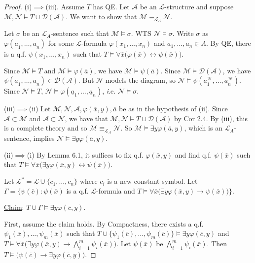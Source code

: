 \documentclass[]{article}
\theoremstyle{custhm}
\theoremstyle{cusdef}
\theoremstyle{custhm}
\theoremstyle{custhm}
\theoremstyle{custhm}
\theoremstyle{ex}
\theoremstyle{custhm}
\theoremstyle{cusdef}
\theoremstyle{remark}
\theoremstyle{remark}
\renewcommand{\L}{\mathcal{L}}
\renewcommand{\it}[1]{\textit{#1}}
\newcommand{\M}{\mathcal{M}}
\renewcommand{\phi}{\varphi}
\renewcommand{\bar}{\overline}
\newcommand{\N}{\mathcal{N}}
\newcommand{\A}{\mathcal{A}}
\newcommand{\D}{\mathcal{D}}
\begin{document}
\begin{proof}
(i)$\implies$(iii). Assume $T$ has QE. Let $\A$ be an $\L$-structure and suppose $\M,\N\models T\cup \D(\A)$. We want to show that $\M \equiv_{\L_A} \N$.

Let $\sigma$ be an $\L_A$-sentence such that $\M\models \sigma$. WTS $\N\models \sigma$. Write $\sigma$ as $\phi(\underline{a}_1,\dots,\underline{a}_n)$ for some $\L$-formula $\phi(x_1,\dots,x_n)$ and $a_1,\dots,a_n\in A$. By QE, there is a q.f. $\psi(x_1,\dots,x_n)$ such that $T\models \forall \bar{x}\big(\phi(\bar{x})\leftrightarrow \psi(\bar{x})\big)$.

Since $\M\models T$ and $\M\models \phi(\bar{a})$, we have $\M\models \psi(\bar{a})$. Since $\M\models\D(\A)$, we have $\psi(\underline{a}_1,\dots,\underline{a}_n)\in\D(\A)$. But $\N$ models the diagram, so $\N\models\psi(\underline{a}_1^\N,\dots,\underline{a}_n^\N)$. Since $\N\models T$, $\N\models \phi(\underline{a}_1,\dots,\underline{a}_n)$, {\it i.e.} $\N\models \sigma$.

(iii)$\implies$(ii) Let $\M,\N,\A,\phi(\bar{x},y),\bar{a}$ be as in the hypothesis of (ii). Since $\A\subset \M$ and $\A\subset \N$, we have that $\M,\N\models T\cup \D(\A)$ by Cor 2.4. By (iii), this is a complete theory and so $\M\equiv_{\L_A}\N$. So $\M\models \exists y\phi(\bar{a},y)$, which is an $\L_A$-sentence, implies $\N\models \exists y \phi(\bar{a},y)$.

(ii)$\implies$(i) By Lemma 6.1, it suffices to fix q.f. $\phi(\bar{x},y)$ and find q.f. $\psi(\bar{x})$ such that $T\models \forall \bar{x}\big(\exists y \phi(\bar{x},y)\leftrightarrow\psi(\bar{x})\big)$.

Let $\L^\ast = \L \cup \{c_1,\dots,c_n\}$ where $c_i$ is a new constant symbol. Let $\Gamma = \{\psi(\bar{c}): \psi(\bar{x})$ is a q.f. $\L$-formula and $T\models \forall\bar{x} \big(\exists y\phi(\bar{x},y)\rightarrow \psi(\bar{x})\big)\}$.

\underline{Claim}: $T\cup \Gamma \models \exists y\phi(\bar{c},y)$.

First, assume the claim holds. By Compactness, there exists a q.f. $\psi_1(\bar{x}),\dots,\psi_m(\bar{x})$ such that $T\cup\{\psi_1(\bar{c}),\dots,\psi_m(\bar{c})\}\models \exists y\phi(\bar{c},y)$ and $T\models \forall \bar{x}\big(\exists y\phi(\bar{x},y)\rightarrow \bigwedge_{i=1}^{m}\psi_i(\bar{x})\big)$. Let $\psi(\bar{x})$ be $\bigwedge_{i=1}^{m}\psi_i(\bar{x})$. Then $T\models \big(\psi(\bar{c}) \rightarrow \exists y\phi(\bar{c},y)\big)$.


\end{proof}
\end{document}

